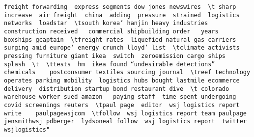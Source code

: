 \documentclass[
]{article}
\begin{document}
\begin{verbatim}
freight forwarding  express segments dow jones newswires  \t sharp increase  air freight  china  adding  pressure  strained  logistics networks  loadstar  \tsouth korea’ hanjin heavy industries  construction received   commercial shipbuilding order   years   boxships gcaptain  \tfreight rates  liquefied natural gas carriers  surging amid europe’ energy crunch lloyd’ list  \tclimate activists  pressing furniture giant ikea  switch  zeroemission cargo ships   splash  \t  \ttests  hm  ikea found “undesirable detections”  chemicals    postconsumer textiles sourcing journal  \treef technology  operates parking mobility  logistics hubs bought lastmile ecommerce delivery  distribution startup bond restaurant dive  \t colorado warehouse worker sued amazon   paying staff  time spent undergoing covid screenings reuters  \tpaul page  editor  wsj logistics report write    paulpagewsjcom  \tfollow  wsj logistics report team paulpage jensmithwsj pdberger  lydsoneal follow  wsj logistics report  twitter  wsjlogistics"                                                                                                                                                                                                                                                                                                                                                                                                                                                                                                                                                                                                                                                                                                                                                                                                                                                                                                                                                                                                                                                                                                                                                                                                                                                                                                                                                                                                                                                                                                                                                                                                                                                                                                                                                                                                                                                                                                                                                                                                                                                                                                                                                                                                                                                                                                                                                                                             
\end{verbatim}
\end{document}
